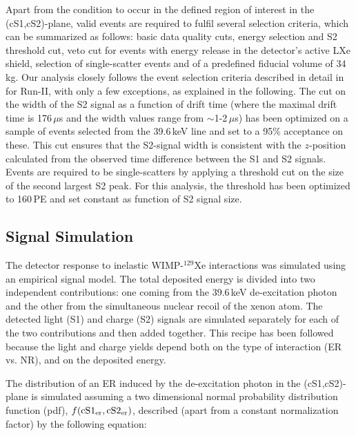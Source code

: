 Apart from the condition to occur in the defined region of interest in the (cS1,cS2)-plane, valid events are required to fulfil several selection criteria, 
which can be summarized as follows: basic data quality cuts, energy selection and S2 threshold cut, veto cut for events with energy release in the detector's 
active LXe shield, selection of single-scatter events and of a predefined fiducial volume of 34\,kg.  
Our analysis closely follows the event selection criteria described in detail in \cite{Aprile:2012vw} for Run-II, with only a few exceptions, as explained in the following. 
The cut on the width of the S2 signal as a function of drift time (where the maximal drift time is 176\,$\mu$s and the width values range from $\sim$1-2\,$\mu$s) has been optimized on a sample of events selected from the 39.6\,keV line and set to a 95\% acceptance on these. This cut ensures that the S2-signal width is consistent with the $z$-position calculated from the observed time difference between the S1 and S2 signals. Events are required to be single-scatters by applying a threshold cut on the size of the 
second largest S2 peak. For this analysis, the threshold has been optimized to 160\,PE and set constant as function of S2 signal size. 


\subsection{Signal Simulation} 

The detector response to inelastic WIMP-$^{129}$Xe interactions was simulated using an empirical signal model.
The total deposited energy is divided into two independent contributions: one coming from the 39.6\,keV de-excitation photon and the other  from  
the simultaneous nuclear recoil of the xenon atom. The detected light (S1) and charge (S2) signals are simulated separately for each of the two contributions 
and then added together. This recipe has been followed  because the light and charge yields depend both on the type of interaction (ER vs. NR), and on the deposited energy.


The distribution of an ER induced by the de-excitation photon in the (cS1,cS2)-plane  is simulated assuming a two dimensional normal probability distribution function (pdf), $f(\rm{cS1}_{er},\rm{cS2}_{er})$, 
described (apart from a constant normalization factor) by the following equation:

